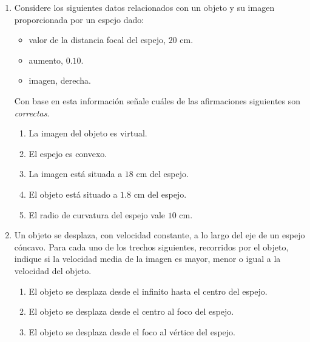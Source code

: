 \documentclass[a4paper, amsfonts, amssymb, amsmath, reprint, showkeys, nofootinbib, twoside]{revtex4-1}
\begin{document}
\begin{enumerate}[start=1, label=\textbf{\arabic*.}]
    \item Considere los siguientes datos relacionados con un objeto y su imagen proporcionada por un espejo dado:
          \begin{itemize}
              \item valor de la distancia focal del espejo, $20 \text{ cm}$.
              \item aumento, $0.10$.
              \item imagen, derecha.
          \end{itemize}
          Con base en esta información señale cuáles de las afirmaciones siguientes son \emph{correctas}.
          \begin{enumerate}[label=\emph{\alph*})]
              \item La imagen del objeto es virtual.
              \item El espejo es convexo.
              \item La imagen está situada a $18 \text{ cm}$ del espejo.
              \item El objeto está situado a $1.8 \text{ cm}$ del espejo.
              \item El radio de curvatura del espejo vale $10 \text{ cm}$.
          \end{enumerate}

    \item Un objeto se desplaza, con velocidad constante, a lo largo del eje de un espejo cóncavo. Para cada uno de los trechos siguientes, recorridos por el objeto, indique si la velocidad media de la imagen es mayor, menor o igual a la velocidad del objeto.
          \begin{enumerate}[label=\emph{\alph*})]
              \item El objeto se desplaza desde el infinito hasta el centro del espejo.
              \item El objeto se desplaza desde el centro al foco del espejo.
              \item El objeto se desplaza desde el foco al vértice del espejo.
          \end{enumerate}

\end{enumerate}
\end{document}
